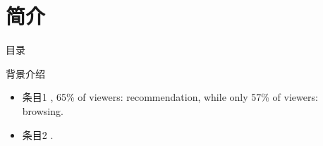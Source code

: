 \section{简介}
\begin{frame}[noframenumbering]{目录}
\end{frame}

\begin{frame}{\insertsection}
	背景介绍
	\vspace{1em}
	\begin{itemize}
		\setlength\itemsep{1em}
		\item 条目1 , 65\% of viewers: recommendation, while only 57\% of viewers:  browsing.
		\item 条目2 .
	\end{itemize}
\end{frame}


